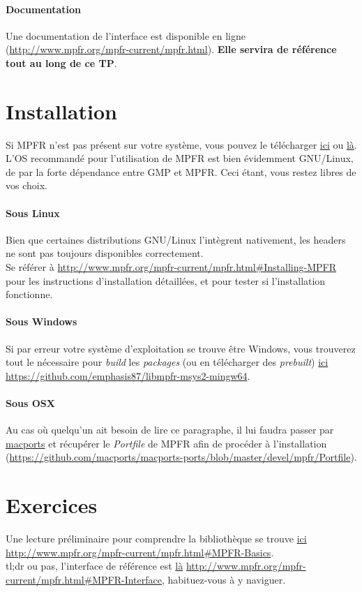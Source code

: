 \documentclass[a4paper,11pt]{exam}
\begin{document}
\paragraph{Documentation} Une documentation de l'interface est disponible en ligne (\url{http://www.mpfr.org/mpfr-current/mpfr.html}). \textbf{Elle servira de référence tout au long de ce TP}.

\section{Installation}
Si MPFR n'est pas présent sur votre système, vous pouvez le télécharger \href{http://www.mpfr.org/}{ici} ou \href{https://ftp.gnu.org/gnu/mpfr/}{là}.
L'OS recommandé pour l'utilisation de MPFR est bien évidemment GNU/Linux, de par la forte dépendance entre GMP et MPFR. Ceci étant, vous restez libres de vos choix.
\paragraph{Sous Linux}
Bien que certaines distributions GNU/Linux l'intègrent nativement, les headers ne sont pas toujours disponibles correctement.\\
Se référer à \url{http://www.mpfr.org/mpfr-current/mpfr.html\#Installing-MPFR} pour les instructions d'installation détaillées, et pour tester si l'installation fonctionne.

\paragraph{Sous Windows}
Si par erreur votre système d'exploitation se trouve être Windows, vous trouverez tout le nécessaire pour \emph{build} les \emph{packages} (ou en télécharger des \emph{prebuilt}) \href{https://github.com/emphasis87/libmpfr-msys2-mingw64}{ici} \url{https://github.com/emphasis87/libmpfr-msys2-mingw64}. %

\paragraph{Sous OSX} 
Au cas où quelqu'un ait besoin de lire ce paragraphe, il lui faudra passer par \href{https://github.com/macports/macports-ports}{macports} et récupérer le \emph{Portfile} de MPFR afin de procéder à l'installation (\url{https://github.com/macports/macports-ports/blob/master/devel/mpfr/Portfile}). %

\section{Exercices}
Une lecture préliminaire pour comprendre la bibliothèque se trouve \href{http://www.mpfr.org/mpfr-current/mpfr.html#MPFR-Basics}{ici} \url{http://www.mpfr.org/mpfr-current/mpfr.html#MPFR-Basics}.\\
tl;dr ou pas, l'interface de référence est \href{http://www.mpfr.org/mpfr-current/mpfr.html#MPFR-Interface}{là} \url{http://www.mpfr.org/mpfr-current/mpfr.html#MPFR-Interface}, habituez-vous à y naviguer. %
\end{document}
